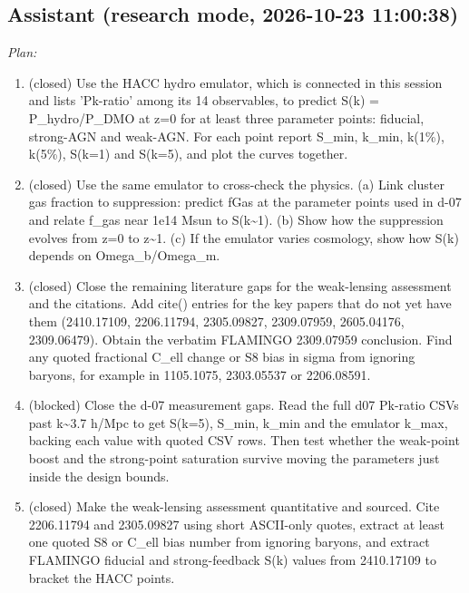 \documentclass[11pt,a4paper]{article}
\begin{document}
\subsection*{Assistant \small(research mode, 2026-10-23 11:00:38)}
\textit{Plan:}\begin{enumerate}
  \item (closed) Use the HACC hydro emulator, which is connected in this session and lists 'Pk-ratio' among its 14 observables, to predict S(k) = P\_hydro/P\_DMO at z=0 for at least three parameter points: fiducial, strong-AGN and weak-AGN. For each point report S\_min, k\_min, k(1\%), k(5\%), S(k=1) and S(k=5), and plot the curves together.
  \item (closed) Use the same emulator to cross-check the physics. (a) Link cluster gas fraction to suppression: predict fGas at the parameter points used in d-07 and relate f\_gas near 1e14 Msun to S(k\textasciitilde{}1). (b) Show how the suppression evolves from z=0 to z\textasciitilde{}1. (c) If the emulator varies cosmology, show how S(k) depends on Omega\_b/Omega\_m.
  \item (closed) Close the remaining literature gaps for the weak-lensing assessment and the citations. Add cite() entries for the key papers that do not yet have them (2410.17109, 2206.11794, 2305.09827, 2309.07959, 2605.04176, 2309.06479). Obtain the verbatim FLAMINGO 2309.07959 conclusion. Find any quoted fractional C\_ell change or S8 bias in sigma from ignoring baryons, for example in 1105.1075, 2303.05537 or 2206.08591.
  \item (blocked) Close the d-07 measurement gaps. Read the full d07 Pk-ratio CSVs past k\textasciitilde{}3.7 h/Mpc to get S(k=5), S\_min, k\_min and the emulator k\_max, backing each value with quoted CSV rows. Then test whether the weak-point boost and the strong-point saturation survive moving the parameters just inside the design bounds.
  \item (closed) Make the weak-lensing assessment quantitative and sourced. Cite 2206.11794 and 2305.09827 using short ASCII-only quotes, extract at least one quoted S8 or C\_ell bias number from ignoring baryons, and extract FLAMINGO fiducial and strong-feedback S(k) values from 2410.17109 to bracket the HACC points.
\end{enumerate}
\end{document}
